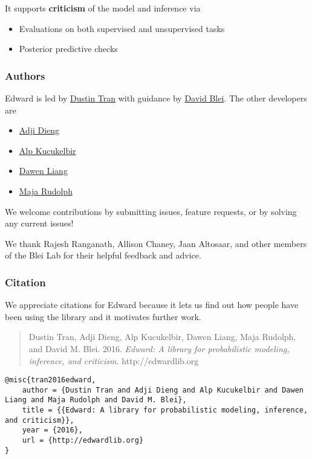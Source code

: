 It supports \textbf{criticism} of the model and inference via
\begin{itemize}
\item Evaluations on both supervised and unsupervised tasks
\item Posterior predictive checks
\end{itemize}

\subsubsection{Authors}

Edward is led by \href{http://dustintran.com}{Dustin Tran} with guidance
by \href{http://www.cs.columbia.edu/~blei/}{David Blei}. The other developers
are
\begin{itemize}
  \item \href{http://stat.columbia.edu/~diengadji/}{Adji Dieng}
  \item \href{http://www.proditus.com/}{Alp Kucukelbir}
  \item \href{http://www.ee.columbia.edu/~dliang/}{Dawen Liang}
  \item \href{http://maja-rita-rudolph.com/}{Maja Rudolph}
\end{itemize}
We welcome contributions by submitting issues, feature requests, or by solving
any current issues!

We thank Rajesh Ranganath, Allison Chaney, Jaan Altosaar, and other
members of the Blei Lab for their helpful feedback and advice.

\subsubsection{Citation}

We appreciate citations for Edward because it lets us find out how
people have been using the library and it motivates further work.

\begin{quote}
Dustin Tran, Adji Dieng, Alp Kucukelbir, Dawen Liang, Maja Rudolph, and David M.
Blei. 2016.
\emph{Edward: A library for probabilistic modeling, inference, and criticism. }
http://edwardlib.org
\end{quote}

\begin{lstlisting}[class=JSON]
@misc{tran2016edward,
    author = {Dustin Tran and Adji Dieng and Alp Kucukelbir and Dawen Liang and Maja Rudolph and David M. Blei},
    title = {{Edward: A library for probabilistic modeling, inference, and criticism}},
    year = {2016},
    url = {http://edwardlib.org}
}
\end{lstlisting}
